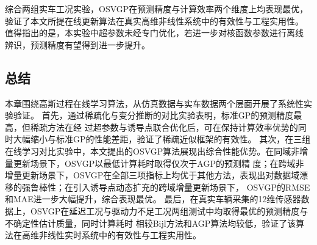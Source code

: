 综合两组实车工况实验，OSVGP在预测精度与计算效率两个维度上均表现最优，
验证了本文所提在线更新算法在真实高维非线性系统中的有效性与工程实用性。
值得指出的是，本实验中超参数未经专门优化，若进一步对核函数参数进行离线
辨识，预测精度有望得到进一步提升。

\subsection{总结}
本章围绕高斯过程在线学习算法，从仿真数据与实车数据两个层面开展了系统性实验验证。
首先，通过稀疏化与变分推断的对比实验表明，标准GP的预测精度最高，但稀疏方法在经
过超参数与诱导点联合优化后，可在保持计算效率优势的同时大幅缩小与标准GP的性能差距，验证了稀疏近似框架的有效性。
其次，在三组在线学习对比实验中，本文提出的OSVGP算法展现出综合性能优势。在同域非增量更新场景下，OSVGP以最低计算耗时取得仅次于AGP的预测精
度；在跨域非增量更新场景下，OSVGP在全部三项指标上均优于其他方法，表现出对数据域漂移的强鲁棒性；在引入诱导点动态扩充的跨域增量更新场景下，
OSVGP的RMSE和MAE进一步大幅提升，综合表现最优。
最后，在真实车辆采集的12维传感器数据上，OSVGP在延迟工况与驱动力不足工况两组测试中均取得最优的预测精度与不确定性估计质量，同时计算耗时
相较Bijl方法和AGP算法均较低，验证了该算法在高维非线性实时系统中的有效性与工程实用性。